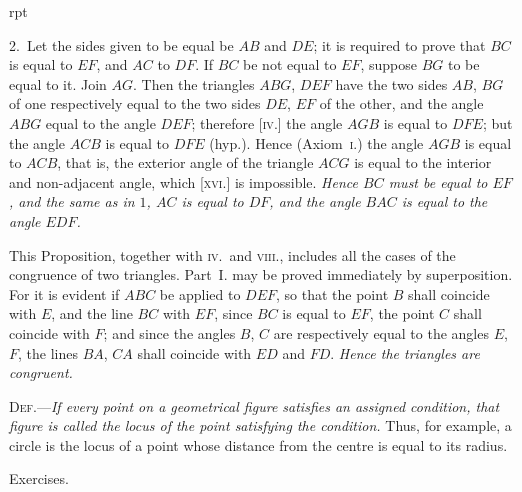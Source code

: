 \documentclass[oneside]{book}
\newcommand\exhead[1]{
\Needspace*{5\baselineskip}\begin{center}
\textsf{#1}
\end{center}
}
\newcommand\imgflow[3]{
\setcounter{wrapwidth}{#1}
\begin{wrapfigure}[#2]{r}{\value{wrapwidth}pt}
\begin{center}
\vspace{-0.3in}
\end{center}
\end{wrapfigure}
}
\begin{document}
\imgflow{160}{9}{f045}

2.~Let the sides given to be equal be $AB$ and $DE$; it is required to prove that
$BC$ is equal to $EF$, and
$AC$ to $DF$. If $BC$ be
not equal to $EF$, suppose
$BG$ to be equal to it.
Join $AG$. Then the triangles
$ABG$, $DEF$ have
the two sides $AB$, $BG$
of one respectively equal
to the two sides $DE$, $EF$ of the other, and the angle
$ABG$ equal to the angle $DEF$; therefore [\textsc{iv}.] the
angle $AGB$ is equal to $DFE$; but the angle $ACB$ is
equal to $DFE$ (hyp.). Hence (Axiom~\textsc{i}.) the angle
$AGB$ is equal to $ACB$, that is, the exterior angle of
the triangle $ACG$ is equal to the interior and non-adjacent
angle, which [\textsc{xvi}.] is impossible. \emph{Hence $BC$
must be equal to $EF$, and the same as in $1$, $AC$ is equal
to $DF$, and the angle $BAC$ is equal to the angle $EDF$.}\par\medskip

\begin{footnotesize}
This Proposition, together with \textsc{iv.}\ and \textsc{viii}., includes all the
cases of the congruence of two triangles. Part~I. may be proved
immediately by superposition. For it is evident if $ABC$ be applied
to $DEF$, so that the point $B$ shall coincide with $E$, and the line
$BC$ with $EF$, since $BC$ is equal to $EF$, the point $C$ shall coincide
with $F$; and since the angles $B$, $C$ are respectively equal to the
angles $E$, $F$, the lines $BA$, $CA$ shall coincide with $ED$ and $FD$.
\emph{Hence the triangles are congruent.}
\par\end{footnotesize}\bigskip


\textsc{Def.}---\textit{If every point on a geometrical figure satisfies an
assigned condition, that figure is called the locus of the
point satisfying the condition.} Thus, for example, a
circle is the locus of a point whose distance from the
centre is equal to its radius.


\exhead{Exercises.}
\end{document}
